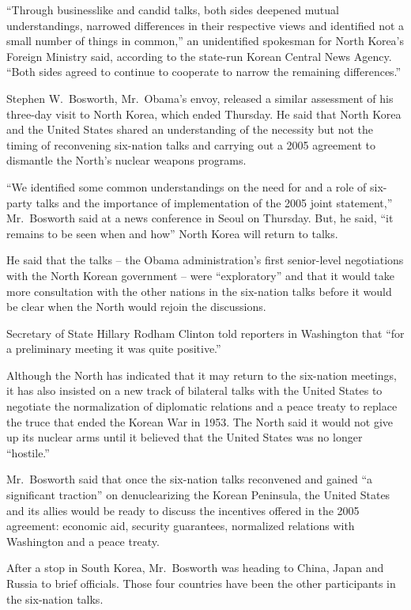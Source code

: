 ﻿\documentclass[12pt]{article}
\begin{document}
``Through businesslike and candid talks, both sides deepened mutual understandings, narrowed
differences in their respective views and identified not a small number of things in common,'' an
unidentified spokesman for North Korea's Foreign Ministry said, according to the state-run Korean
Central News Agency. ``Both sides agreed to continue to cooperate to narrow the remaining
differences.''

Stephen W.~Bosworth, Mr.~Obama's envoy, released a similar assessment of his three-day visit to
North Korea, which ended Thursday. He said that North Korea and the United States shared an
understanding of the necessity but not the timing of reconvening six-nation talks and carrying out a
2005 agreement to dismantle the North's nuclear weapons programs.

``We identified some common understandings on the need for and a role of six-party talks and the
importance of implementation of the 2005 joint statement,'' Mr.~Bosworth said at a news conference
in Seoul on Thursday. But, he said, ``it remains to be seen when and how'' North Korea will return
to talks.

He said that the talks -- the Obama administration's first senior-level negotiations with the North
Korean government -- were ``exploratory'' and that it would take more consultation with the other
nations in the six-nation talks before it would be clear when the North would rejoin the
discussions.

Secretary of State Hillary Rodham Clinton told reporters in Washington that ``for a preliminary
meeting it was quite positive.''

Although the North has indicated that it may return to the six-nation meetings, it has also insisted
on a new track of bilateral talks with the United States to negotiate the normalization of
diplomatic relations and a peace treaty to replace the truce that ended the Korean War in 1953. The
North said it would not give up its nuclear arms until it believed that the United States was no
longer ``hostile.''

Mr.~Bosworth said that once the six-nation talks reconvened and gained ``a significant traction'' on
denuclearizing the Korean Peninsula, the United States and its allies would be ready to discuss the
incentives offered in the 2005 agreement: economic aid, security guarantees, normalized relations
with Washington and a peace treaty.

After a stop in South Korea, Mr.~Bosworth was heading to China, Japan and Russia to brief officials.
Those four countries have been the other participants in the six-nation talks.
\end{document}
